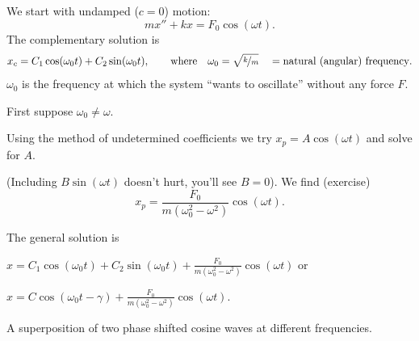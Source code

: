 \documentclass[10pt,aspectratio=169]{beamer}
\begin{document}
\begin{frame}
We start with undamped ($c=0$) motion:
\[
mx'' + kx = F_0 \cos (\omega t) .
\]
\pause
The complementary solution is
\[
x_c = C_1 \cos (\omega_0 t) + C_2 \sin (\omega_0 t) ,
\qquad
\text{where}
\quad
\omega_0 = \sqrt{\nicefrac{k}{m}} 
\quad = \text{natural (angular) frequency}.
\]
\pause
$\omega_0$ is the frequency
at which the system ``wants to oscillate'' without any force $F$.

\medskip
\pause

First suppose \quad $\omega_0 \not= \omega$.

\medskip
\pause

Using the method of undetermined coefficients we try
\quad
$x_p = A \cos (\omega t)$
\quad and solve for $A$.

\medskip
\pause

(Including $B\sin(\omega t)$ doesn't hurt, you'll see $B=0$).
\pause
We find (exercise)
\[
x_p = \frac{F_0}{m(\omega_0^2 - \omega^2)} \cos (\omega t) .
\]
\pause
\vspace*{-0.2in}

The general solution is

\medskip

\quad $\displaystyle x = C_1 \cos (\omega_0 t) + C_2 \sin (\omega_0 t) +
\frac{F_0}{m(\omega_0^2 - \omega^2)} \cos (\omega t)$
\quad \pause or

\vspace*{-0.05in}

\hspace*{3in}$\displaystyle x = C \cos (\omega_0 t - \gamma) +
\frac{F_0}{m(\omega_0^2 - \omega^2)} \cos (\omega t)$.

\medskip

A superposition of two phase shifted cosine waves at different frequencies.
\end{frame}
\end{document}
